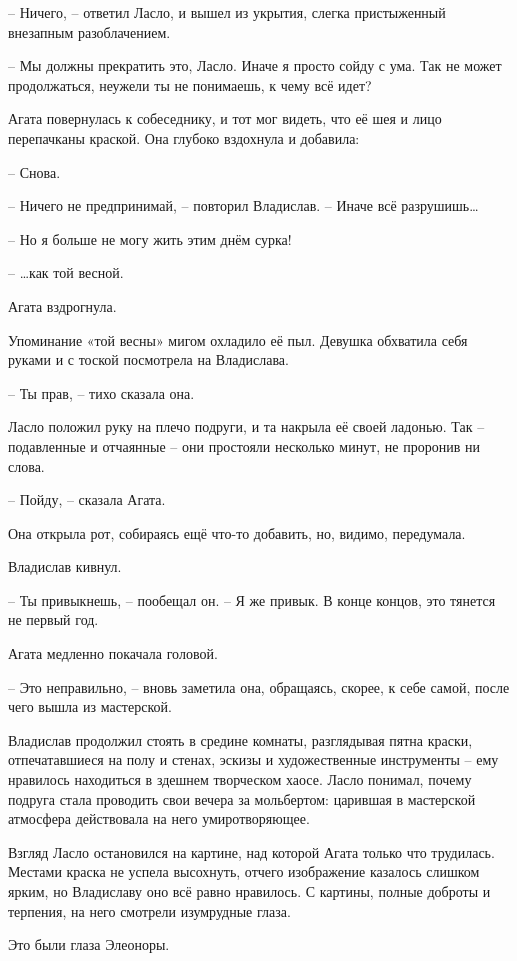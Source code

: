 \documentclass[
  a5paperpaper,
  DIV=11,
  numbers=noendperiod]{scrreprt}
\begin{document}
-- Ничего, -- ответил Ласло, и вышел из укрытия, слегка пристыженный
внезапным разоблачением.

-- Мы должны прекратить это, Ласло. Иначе я просто сойду с ума. Так не
может продолжаться, неужели ты не понимаешь, к чему всё идет?

Агата повернулась к собеседнику, и тот мог видеть, что её шея и лицо
перепачканы краской. Она глубоко вздохнула и добавила:

-- Снова.

-- Ничего не предпринимай, -- повторил Владислав. -- Иначе всё
разрушишь\ldots{}

-- Но я больше не могу жить этим днём сурка!

-- \ldots как той весной.

Агата вздрогнула.

Упоминание «той весны» мигом охладило её пыл. Девушка обхватила себя
руками и с тоской посмотрела на Владислава.

-- Ты прав, -- тихо сказала она.

Ласло положил руку на плечо подруги, и та накрыла её своей ладонью. Так
-- подавленные и отчаянные -- они простояли несколько минут, не проронив
ни слова.

-- Пойду, -- сказала Агата.

Она открыла рот, собираясь ещё что-то добавить, но, видимо, передумала.

Владислав кивнул.

-- Ты привыкнешь, -- пообещал он. -- Я же привык. В конце концов, это
тянется не первый год.

Агата медленно покачала головой.

-- Это неправильно, -- вновь заметила она, обращаясь, скорее, к себе
самой, после чего вышла из мастерской.

Владислав продолжил стоять в средине комнаты, разглядывая пятна краски,
отпечатавшиеся на полу и стенах, эскизы и художественные инструменты --
ему нравилось находиться в здешнем творческом хаосе. Ласло понимал,
почему подруга стала проводить свои вечера за мольбертом: царившая в
мастерской атмосфера действовала на него умиротворяющее.

Взгляд Ласло остановился на картине, над которой Агата только что
трудилась. Местами краска не успела высохнуть, отчего изображение
казалось слишком ярким, но Владиславу оно всё равно нравилось. С
картины, полные доброты и терпения, на него смотрели изумрудные глаза.

Это были глаза Элеоноры.
\end{document}
